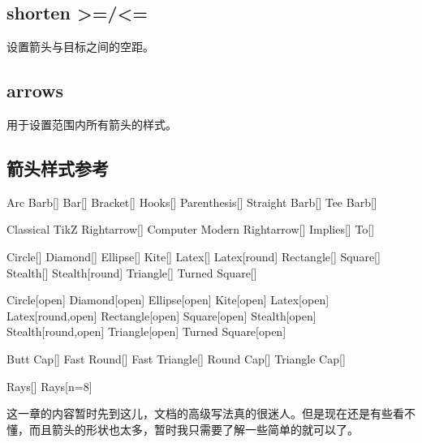 \subsection{shorten >=/<=}
设置箭头与目标之间的空距。

\subsection{arrows}
用于设置范围内所有箭头的样式。

\subsection{箭头样式参考}
\begin{arrowexamples}
	\arrowexample Arc Barb[]
	\arrowexample Bar[]
	\arrowexample Bracket[]
	\arrowexample Hooks[]
	\arrowexample Parenthesis[]
	\arrowexample Straight Barb[]
	\arrowexample Tee Barb[]
\end{arrowexamples}

\begin{arrowexamples}
	\arrowexample Classical TikZ Rightarrow[]
	\arrowexample Computer Modern Rightarrow[]
	\arrowexampledouble Implies[]
	\arrowexample To[]
\end{arrowexamples}

\begin{arrowexamples}
	\arrowexample Circle[]
	\arrowexample Diamond[]
	\arrowexample Ellipse[]
	\arrowexample Kite[]
	\arrowexample Latex[]
	\arrowexample Latex[round]
	\arrowexample Rectangle[]
	\arrowexample Square[]
	\arrowexample Stealth[]
	\arrowexample Stealth[round]
	\arrowexample Triangle[]
	\arrowexample Turned Square[]
\end{arrowexamples}

\begin{arrowexamples}
	\arrowexample Circle[open]
	\arrowexample Diamond[open]
	\arrowexample Ellipse[open]
	\arrowexample Kite[open]
	\arrowexample Latex[open]
	\arrowexample Latex[round,open]
	\arrowexample Rectangle[open]
	\arrowexample Square[open]
	\arrowexample Stealth[open]
	\arrowexample Stealth[round,open]
	\arrowexample Triangle[open]
	\arrowexample Turned Square[open]
\end{arrowexamples}

\begin{arrowcapexamples}
	\arrowcapexample Butt Cap[]
	\arrowcapexample Fast Round[]
	\arrowcapexample Fast Triangle[]
	\arrowcapexample Round Cap[]
	\arrowcapexample Triangle Cap[]
\end{arrowcapexamples}

\begin{arrowexamples}
	\arrowexample Rays[]
	\arrowexample Rays[n=8]
\end{arrowexamples}

这一章的内容暂时先到这儿，文档的高级写法真的很迷人。但是现在还是有些看不懂，而且箭头的形状也太多，暂时我只需要了解一些简单的就可以了。
